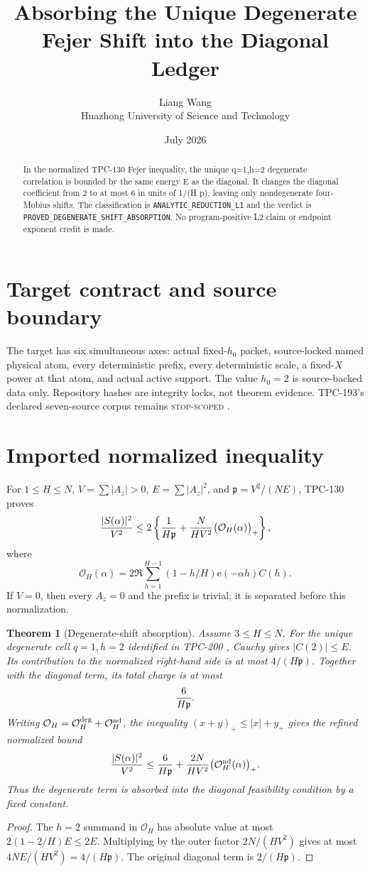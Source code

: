 \documentclass[11pt]{article}
\title{\textbf{Absorbing the Unique Degenerate Fejer Shift into the Diagonal Ledger}}
\author{Liang Wang\\Huazhong University of Science and Technology}
\date{July 2026}
\newtheorem{theorem}{Theorem}
\newcommand{\e}{\mathrm{e}}
\begin{document}
\maketitle
\begin{abstract}
In the normalized TPC-130 Fejer inequality, the unique q=1,h=2 degenerate correlation is bounded by the same energy E as the diagonal.  It changes the diagonal coefficient from 2 to at most 6 in units of 1/(H p), leaving only nondegenerate four-Mobius shifts.
The classification is \texttt{ANALYTIC\_\allowbreak{}REDUCTION\_\allowbreak{}L1} and the
verdict is \texttt{PROVED\_\allowbreak{}DEGENERATE\_\allowbreak{}SHIFT\_\allowbreak{}ABSORPTION}.  No program-positive L2
claim or endpoint exponent credit is made.
\end{abstract}

\section{Target contract and source boundary}
The target has six simultaneous axes: actual fixed-\(h_0\) packet,
source-locked named physical atom, every deterministic prefix, every
deterministic scale, a fixed-\(X\) power at that atom, and actual active
support.  The value \(h_0=2\) is source-backed data only.  Repository hashes
are integrity locks, not theorem evidence.  TPC-193's declared seven-source
corpus remains \textsc{stop-scoped} \citep{WangTPC193}.


\section{Imported normalized inequality}
For \(1\le H\le N\), \(V=\sum|A_z|>0\),
\(E=\sum|A_z|^2\), and
\(\mathfrak p=V^2/(NE)\), TPC-130 proves
\citep{WangTPC130}
\[
 { |S(\alpha)|^2\over V^2}
 \le 2\left\{{1\over H\mathfrak p}
 +{N\over HV^2}\bigl(\mathcal O_H(\alpha)\bigr)_+\right\},
\]
where
\[
 \mathcal O_H(\alpha)=
 2\Re\sum_{h=1}^{H-1}(1-h/H)\e(-\alpha h)C(h).
\]
If \(V=0\), then every \(A_z=0\) and the prefix is trivial; it is
separated before this normalization.

\begin{theorem}[Degenerate-shift absorption]
Assume \(3\le H\le N\).  For the unique degenerate cell
\(q=1,h=2\) identified in TPC-200 \citep{WangTPC200}, Cauchy gives
\(|C(2)|\le E\).  Its contribution to the normalized right-hand side is at
most \(4/(H\mathfrak p)\).  Together with the diagonal term, its total charge
is at most
\[
 {6\over H\mathfrak p}.
\]
Writing
\(\mathcal O_H=\mathcal O_H^{\rm deg}+\mathcal O_H^{\rm nd}\), the inequality
\((x+y)_+\le |x|+y_+\) gives the refined normalized bound
\[
 { |S(\alpha)|^2\over V^2}
 \le {6\over H\mathfrak p}
 +{2N\over HV^2}\bigl(\mathcal O_H^{\rm nd}(\alpha)\bigr)_+.
\]
Thus the degenerate term is absorbed into the diagonal feasibility
condition by a fixed constant.
\end{theorem}
\begin{proof}
The \(h=2\) summand in \(\mathcal O_H\) has absolute value at most
\(2(1-2/H)E\le2E\).  Multiplying by the outer factor
\(2N/(HV^2)\) gives at most
\(4NE/(HV^2)=4/(H\mathfrak p)\).  The original diagonal term is
\(2/(H\mathfrak p)\).
\end{proof}
\end{document}
